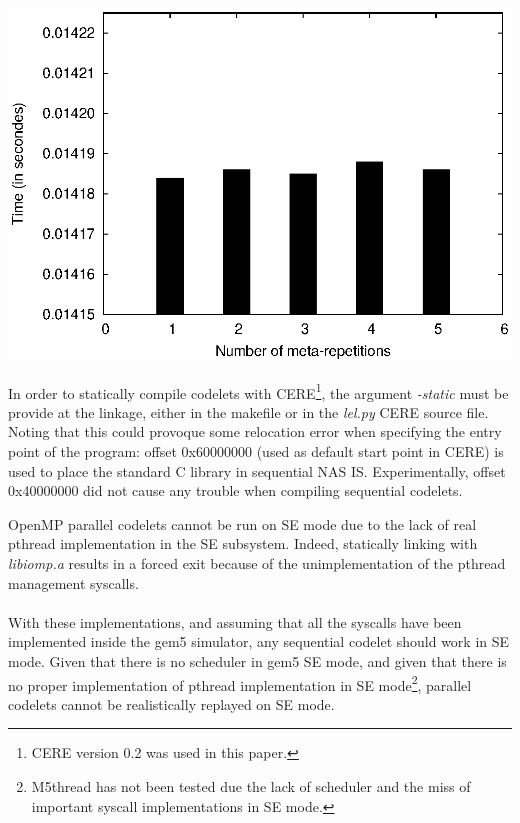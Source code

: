 \documentclass{article}
\newenvironment{Figure}
  {\par\medskip\noindent\center\minipage{0.9\linewidth}}
  {\endminipage\par\bigskip\medskip}
\begin{document}
\begin{multicols}{2}
\begin{Figure}
\centering
\includegraphics[width=\linewidth]{vari_se.eps}
\end{Figure}


In order to statically compile codelets with CERE\footnote{CERE version 0.2 was used in this paper.}, the argument \textit{-static} must be provide at the linkage, either in the makefile or in the \textit{lel.py} CERE source file. Noting that this could provoque some relocation error when specifying the entry point of the program: offset 0x60000000 (used as default start point in CERE) is used to place the standard C library in sequential NAS IS. Experimentally, offset 0x40000000 did not cause any trouble when compiling sequential codelets. 


OpenMP parallel codelets cannot be run on SE mode due to the lack of real pthread implementation in the SE subsystem. Indeed, statically linking with \textit{libiomp.a} results in a forced exit because of the unimplementation of the pthread management syscalls.

\paragraph{}
With these implementations, and assuming that all the syscalls have been implemented inside the gem5 simulator, any sequential codelet should work in SE mode. Given that there is no scheduler in gem5 SE mode, and given that there is no proper implementation of pthread implementation in SE mode\footnote{M5thread has not been tested due the lack of scheduler and the miss of important syscall implementations in SE mode.}, parallel codelets cannot be realistically replayed on SE mode.


\end{multicols}
\end{document}
